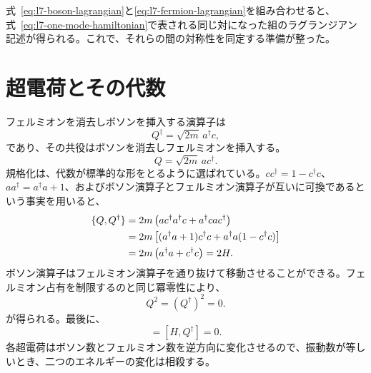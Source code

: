 式~\eqref{eq:l7-boson-lagrangian}と\eqref{eq:l7-fermion-lagrangian}を組み合わせると、式~\eqref{eq:l7-one-mode-hamiltonian}で表される同じ対になった組のラグランジアン記述が得られる。これで、それらの間の対称性を同定する準備が整った。

\section{超電荷とその代数}

フェルミオンを消去しボソンを挿入する演算子は
\begin{equation}
Q^\dagger=\sqrt{2m}\,a^\dagger c,
\end{equation}
であり、その共役はボソンを消去しフェルミオンを挿入する。
\begin{equation}
Q=\sqrt{2m}\,a c^\dagger.
\end{equation}
規格化は、代数が標準的な形をとるように選ばれている。\(cc^\dagger=1-c^\dagger c\)、\(aa^\dagger=a^\dagger a+1\)、およびボソン演算子とフェルミオン演算子が互いに可換であるという事実を用いると、
\begin{align}
\{Q,Q^\dagger\}
&=2m\left(ac^\dagger a^\dagger c+a^\dagger c a c^\dagger\right)\notag\\
&=2m\left[(a^\dagger a+1)c^\dagger c
+a^\dagger a(1-c^\dagger c)\right]\notag\\
&=2m\left(a^\dagger a+c^\dagger c\right)=2H.
\label{eq:l7-superalgebra}
\end{align}
ボソン演算子はフェルミオン演算子を通り抜けて移動させることができる。フェルミオン占有を制限するのと同じ冪零性により、
\begin{equation}
Q^2=(Q^\dagger)^2=0.
\end{equation}
が得られる。最後に、
\begin{equation}
[H,Q]=[H,Q^\dagger]=0.
\label{eq:l7-conserved-supercharges}
\end{equation}
各超電荷はボソン数とフェルミオン数を逆方向に変化させるので、振動数が等しいとき、二つのエネルギーの変化は相殺する。

\begin{classroomqa}
\end{classroomqa}

\begin{classroomqa}
\end{classroomqa}

